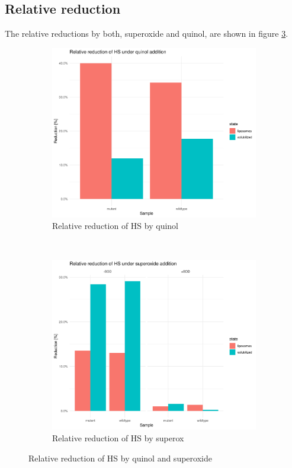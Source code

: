 \subsection{Relative reduction}

The relative reductions by both, superoxide and quinol, are shown in figure
\ref{fig:reduction_relative}.

\begin{figure}
    \centering
    \begin{subfigure}{0.45\textwidth}
	\includegraphics[width=\textwidth]{img/reduction_quinol_relative.png}
	\caption{Relative reduction of HS by quinol}
	\label{fig:reduction_quinol_relative}
    \end{subfigure}
    ~
    \begin{subfigure}{0.45\textwidth}
	\centering
	\includegraphics[width=\textwidth]{img/reduction_superox_relative.png}
	\caption{Relative reduction of HS by superox}
	\label{fig:reduction_superox_relative}
    \end{subfigure}
    \caption{Relative reduction of HS by quinol and superoxide}
    \label{fig:reduction_relative}
\end{figure}

